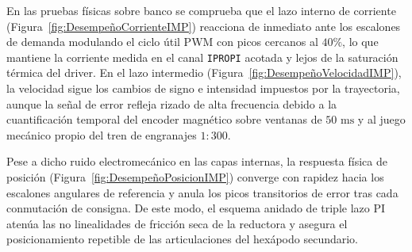 En las pruebas físicas sobre banco se comprueba que el lazo interno de corriente (Figura~\ref{fig:DesempeñoCorrienteIMP}) reacciona de inmediato ante los escalones de demanda modulando el ciclo útil PWM con picos cercanos al $40\%$, lo que mantiene la corriente medida en el canal \texttt{IPROPI} acotada y lejos de la saturación térmica del driver. En el lazo intermedio (Figura~\ref{fig:DesempeñoVelocidadIMP}), la velocidad sigue los cambios de signo e intensidad impuestos por la trayectoria, aunque la señal de error refleja rizado de alta frecuencia debido a la cuantificación temporal del encoder magnético sobre ventanas de $50\text{ ms}$ y al juego mecánico propio del tren de engranajes $1:300$.

Pese a dicho ruido electromecánico en las capas internas, la respuesta física de posición (Figura~\ref{fig:DesempeñoPosicionIMP}) converge con rapidez hacia los escalones angulares de referencia y anula los picos transitorios de error tras cada conmutación de consigna. De este modo, el esquema anidado de triple lazo PI atenúa las no linealidades de fricción seca de la reductora y asegura el posicionamiento repetible de las articulaciones del hexápodo secundario.
